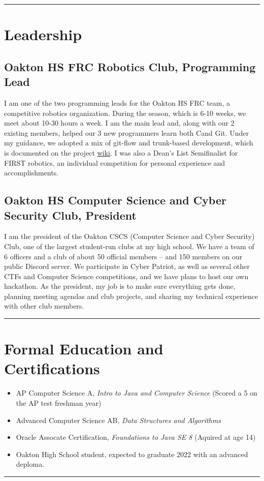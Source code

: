 \documentclass[10pt,letterpaper]{article}
\def\link#1#2{\color{blue!60!black}\href{#1}{#2}\color{black}}
\newcommand{\CPP}
{C\nolinebreak[4]\hspace{-.05em}\raisebox{.35ex}{\footnotesize\bf ++}}
\def\paddedItem#1{\vspace{-0.4em}\item #1}
\begin{document}
    \hrule
    \vspace{-0.4em}

    \section*{Leadership}
    \subsection*{Oakton HS FRC Robotics Club, Programming Lead}

    I am one of the two programming leads for the Oakton HS FRC team,
    a competitive robotics organization.
    During the season, which is 6-10 weeks, we meet about 10-30 hours a week.
    I am the main lead and, along with our 2 existing members,
    helped our 3 new programmers learn both \CPP and Git.
    Under my guidance, we adopted a mix of git-flow and trunk-based development,
    which is documented on the project \link{https://github.com/CougarProgramming623/InfiniteRecharge/wiki/Git}{wiki}.
    I was also a Dean's List Semifinalist for FIRST robotics,
    an individual competition for personal experience and accomplishments.

    \subsection*{Oakton HS Computer Science and Cyber Security Club, President}

    I am the president of the Oakton CSCS (Computer Science and Cyber Security) Club,
    one of the largest student-run clubs at my high school. 
    We have a team of 6 officers and a club of about 50 official members -- and 150 members on our public Discord server.
    We participate in Cyber Patriot, as well as several other CTFs and Computer Science competitions,
    and we have plans to host our own hackathon.
    As the president, my job is to make sure everything gets done, planning meeting agendas and club projects,
    and sharing my technical experience with other club members. 

    \vspace{1em}
    \hrule

    \section*{Formal Education and Certifications}
    \begin{itemize}
        \paddedItem AP Computer Science A, \textit{Intro to Java and Computer Science}  (Scored a 5 on the AP test freshman year)
        \paddedItem Advanced Computer Science AB, \textit{Data Structures and Algorithms}
        \paddedItem Oracle Assocate Certification, \textit{Foundations to Java SE 8} (Aquired at age 14)
        \paddedItem Oakton High School student, expected to graduate 2022 with an advanced deploma.
    \end{itemize}
    \vspace{0.3em}
    \hrule
    
\end{document}

